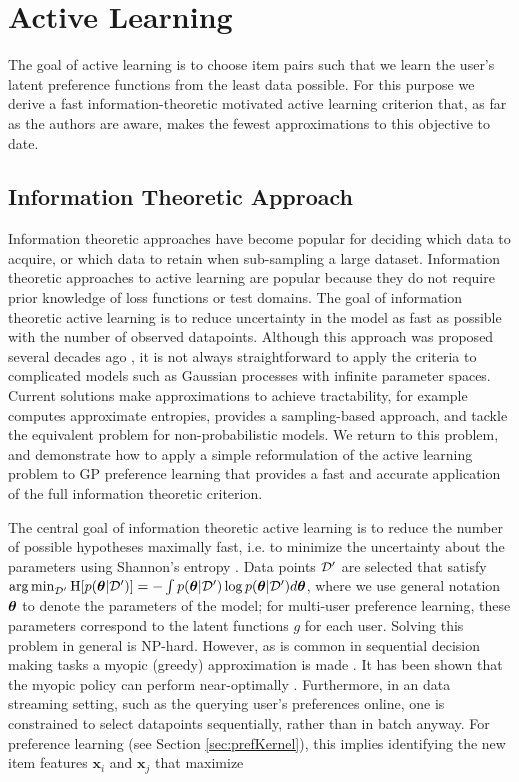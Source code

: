 \section{Active Learning \label{sec:active}}

The goal of active learning is to choose item pairs such that we learn the
user's latent preference functions from the least data possible.
For this purpose we derive a fast information-theoretic motivated active
learning criterion that, as far as the authors are aware, makes the fewest approximations to this objective to date.

\subsection{Information Theoretic Approach}

Information theoretic approaches have become popular for deciding which data to acquire, or which data to retain when sub-sampling a large dataset. Information theoretic approaches to active learning are popular because
they do not require prior knowledge of loss functions or test domains.
The goal of information theoretic active learning is to reduce uncertainty in the
model as fast as possible with the number of observed datapoints.
Although this approach was proposed several decades ago \citep{lindley1956, bernardo1979}, it is not always straightforward to apply the criteria to complicated models such as Gaussian processes with infinite parameter spaces. Current solutions make approximations to achieve tractability, for example \citep{lawrence2002} computes approximate entropies, \citep{freund1997} provides a sampling-based approach, and \citep{tong2001} tackle the equivalent problem for non-probabilistic models. We return to this problem, and demonstrate how to apply a simple reformulation of the active learning problem to GP preference learning that provides a fast and accurate application of the full information theoretic criterion.

The central goal of information theoretic active learning is to reduce the number of possible hypotheses maximally fast, i.e. to minimize the uncertainty about the parameters using Shannon's entropy \citep{coverandthomas}. Data points $\mathcal{D}'$ are selected that satisfy $\operatorname*{arg \min}_{\mathcal{D}'}\mathrm{H}[p(\bm{\theta}|\mathcal{D}')]=-\int p(\bm{\theta}|\mathcal{D}')\log p(\bm{\theta}|\mathcal{D}') d\bm{\theta}$, where we use general notation $\bm{\theta}$ to denote the parameters of the model; for multi-user preference learning, these parameters correspond to the latent functions $g$ for each user. Solving this problem in general is NP-hard. However, as is common in sequential decision making tasks a myopic (greedy) approximation is made \citep{heckerman1995}. It has been shown that the myopic policy can perform near-optimally \citep{dasgupta2005,golovin2010}. 
Furthermore, in an data streaming setting, such as the querying user's preferences online, one is constrained to select datapoints sequentially, rather than in batch anyway.
For preference learning (see Section \ref{sec:prefKernel}), this implies
identifying the new item features $\mathbf{x}_i$ and $\mathbf{x}_j$ that maximize

